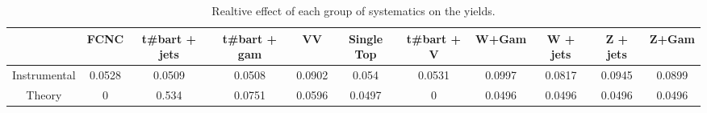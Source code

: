 \begin{table}[htbp]
\begin{center}
\begin{tabular}{|c|c|c|c|c|c|c|c|c|c|c|}
\hline 
      & FCNC      & t#bar{t} + jets      & t#bar{t} +  gam      & VV      & Single Top      & t#bar{t} + V      & W+Gam      & W + jets      & Z + jets      & Z+Gam \\ 
\hline 
 Instrumental & 0.0528 & 0.0509 & 0.0508 & 0.0902 & 0.054 & 0.0531 & 0.0997 & 0.0817 & 0.0945 & 0.0899 \\ 
 Theory & 0 & 0.534 & 0.0751 & 0.0596 & 0.0497 & 0 & 0.0496 & 0.0496 & 0.0496 & 0.0496 \\ 
\hline 
\end{tabular} 
\caption{Realtive effect of each group of systematics on the yields.} 
\end{center} 
\end{table} 
